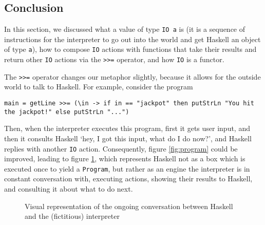 \documentclass[11	pt]{article}
\theoremstyle{nonumberplain}
\newcommand*\lsin{\lstinline}
\begin{document}
\subsection{Conclusion}

In this section, we discussed what a value of type \lsin|IO a| is (it is a sequence of instructions for the interpreter to go out into the world and get Haskell an object of type \lsin|a|), how to compose \lsin|IO| actions with functions that take their results and return other \lsin|IO| actions via the \lsin|>>=| operator, and how \lsin|IO| is a functor.

The \lsin|>>=| operator changes our metaphor slightly, because it allows for the outside world to talk to Haskell. For example, consider the program
\begin{lstlisting}
main = getLine >>= (\in -> if in == "jackpot" then putStrLn "You hit the jackpot!" else putStrLn "...")
\end{lstlisting}

Then, when the interpreter executes this program, first it gets user input, and then it consults Haskell `hey, I got this input, what do I do now?', and Haskell replies with another \lsin|IO| action. Consequently, figure \ref{fig:program} could be improved, leading to figure \ref{fig:program2}, which represents Haskell not as a box which is executed once to yield a \lsin|Program|, but rather as an engine the interpreter is in constant conversation with, executing actions, showing their results to Haskell, and consulting it about what to do next.
\begin{figure}
\centering
{}
\caption{Visual representation of the ongoing conversation between Haskell and the (fictitious) interpreter}\label{fig:program2}
\end{figure}
\end{document}
